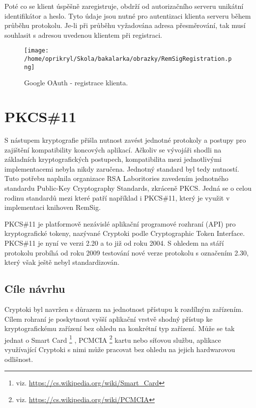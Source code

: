 \documentclass[]{fithesis3}
\begin{document}
	Poté co se klient úspěšně zaregistruje, obdrží od autorizačního serveru unikátní identifikátor a 		heslo. Tyto údaje jsou nutné pro autentizaci klienta serveru během průběhu protokolu. Je-li při 		průběhu vyžadována adresa přesměrování, tak musí souhlasit s adresou uvedenou klientem při 	registraci.

	\begin{figure}[!ht]
  		\begin{minipage}{1.00\textwidth}
    			\texttt{[image: /home/oprikryl/Skola/bakalarka/obrazky/RemSigRegistration.png]}
  		\end{minipage}
 		\caption{Google OAuth - registrace klienta.}
  		\label{fig:Google OAuth - registrace klienta.}
	\end{figure}	
	\newpage

\chapter{PKCS\#11}

S nástupem kryptografie přišla nutnost zavést jednotné protokoly a postupy pro zajištění kompatibility koncových aplikací. Ačkoliv se vývojáři shodli na základních kryptografických postupech, kompatibilita mezi jednotlivými implementacemi nebyla nikdy zaručena. Jednotný standard byl tedy nutností. Tuto potřebu naplnila organizace RSA Laboritories zavedením jednotného standardu Public-Key Cryptography Standards, zkráceně PKCS. Jedná se o celou rodinu standardů mezi které patří například i PKCS\#11, který je využit v implementaci knihoven RemSig.

PKCS\#11 je platformově nezávislé aplikační programové rozhraní (API) pro kryptografické tokeny, nazývané Cryptoki podle Cryptographic Token Interface. PKCS\#11 je nyní ve verzi 2.20 a to již od roku 2004. S ohledem na stáří protokolu probíhá od roku 2009 testování nové verze protokolu s označením 2.30, který však ještě nebyl standardizován.

	\section{Cíle návrhu}

	Cryptoki byl navržen s důrazem na jednotnost přístupu k rozdílným zařízením. Cílem rohraní je 		poskytnout vyšší aplikační vrstvě shodný přístup ke kryptografickému zařízení bez ohledu na 		konkrétní typ zařízení. Může se tak jednat o 
	Smart Card \footnote{viz. \url{https://cs.wikipedia.org/wiki/Smart_Card}} 
	, 
	PCMCIA \footnote{viz. \url{https://cs.wikipedia.org/wiki/PCMCIA}} 
	kartu nebo síťovou službu, aplikace využívající Cryptoki s nimi může pracovat bez ohledu na 		jejich hardwarovou odlišnost.
\end{document}
